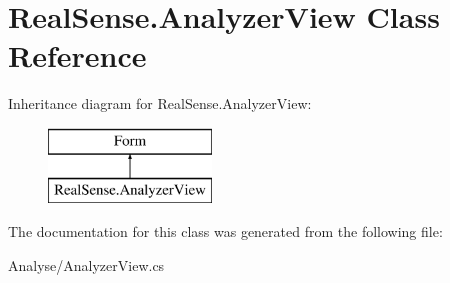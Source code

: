\section{Real\+Sense.\+Analyzer\+View Class Reference}
\label{class_real_sense_1_1_analyzer_view}
Inheritance diagram for Real\+Sense.\+Analyzer\+View\+:\begin{figure}[H]
\begin{center}
\leavevmode
\includegraphics[height=2.000000cm]{class_real_sense_1_1_analyzer_view}
\end{center}
\end{figure}


The documentation for this class was generated from the following file\+:\begin{DoxyCompactItemize}
\item 
Analyse/Analyzer\+View.\+cs\end{DoxyCompactItemize}
